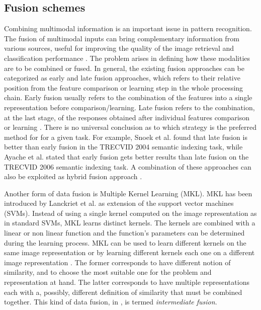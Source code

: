 \documentclass[journal,11pt]{IEEEtran}
\newcommand{\ADD}[1]{#1}
\begin{document}
\subsection{Fusion schemes}
\ADD{
Combining multimodal information is an important issue in pattern recognition. The
fusion of multimodal inputs can bring complementary information from various
sources, useful for improving the quality of the image retrieval and classification performance \cite{atrey2010multimodal}. The problem arises in defining how these modalities are to be
combined or fused. In general,
the existing fusion approaches can be categorized as early and late fusion
approaches, which refers to their relative position from the
feature comparison or learning step in the whole processing chain. Early fusion usually refers
to the combination of the features into a single representation before comparison/learning.
Late fusion refers to the combination, at the last stage, of the responses obtained after
individual features comparison or learning \cite{snoek2005early,noble04}.
There is no universal conclusion as to which strategy is
the preferred method for for a given task. For example, Snoek et al. \cite{snoek2005early}
found that late fusion is better than early fusion in the TRECVID 2004 semantic
indexing task, while Ayache et al. \cite{ayache2007classifier} stated that early fusion gets better results
than late fusion on the TRECVID 2006 semantic indexing task.
A combination of these approaches can also be exploited as hybrid fusion
approach \cite{wu2005multi}.
}

\ADD{Another form of data fusion is Multiple Kernel Learning (MKL). MKL has been introduced by Lanckriet et al. \cite{lanckriet04} as extension of the support vector machines (SVMs). Instead of using a single kernel computed on the image representation as in standard SVMs, MKL learns distinct kernels. The kernels are combined with a linear or non linear function and the function's parameters can be determined during the learning process. MKL can be used to learn different kernels on the same image representation or by learning different kernels each one on a different image representation \cite{gonen2011multiple}. The former corresponds to have different notion of similarity, and to choose the most suitable one for the problem and representation at hand. The latter corresponds to have multiple representations each with a, possibly, different definition of similarity that must be combined together. This kind of data fusion, in \cite{noble04}, is termed \emph{intermediate fusion}.}
\end{document}
